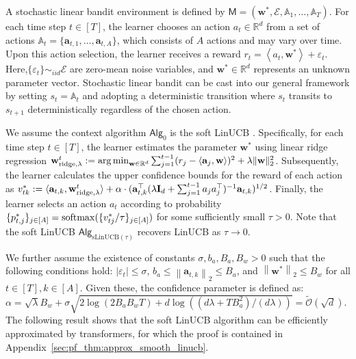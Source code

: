 \documentclass[10pt]{article}
\newcommand{\id}{\bI}
\newcommand{\eps}{\varepsilon}
\DeclareMathOperator*{\argmin}{arg\,min}
\newcommand{\norm}[1]{\left\|{#1}\right\|}
\newcommand{\ltwo}[1]{\norm{#1}_2}
\newcommand{\<}{\left\langle}
\renewcommand{\>}{\right\rangle}
\newcommand{\ridge}{{\rm ridge}}
\newcommand{\R}{\mathbb{R}}
\newcommand{\inst}{{\mathsf{M}}}
\newcommand{\sLinUCB}{{\mathrm{sLinUCB}}}
\newcommand{\temp}{{\tau}}
\newcommand{\cwid}{{\alpha}}
\newcommand{\tcO}{{\tilde{\mathcal O}}}
\newcommand{\action}{{a}}
\newcommand{\reward}{{r}}
\newcommand{\totlen}{{T}}
\newcommand{\softmax}{{\rm softmax}}
\newcommand{\sAlg}{{\mathsf{Alg}}}
\newcommand{\aset}{{\sA}}
\newcommand{\TrueLBPar}{{\bw^*}}
\newcommand{\Noise}{{\eps}}
\newcommand{\Noisedist}{{\mathcal{E}}}
\newcommand{\Numact}{{A}}
\def\sA{{\mathbb{A}}}
\def\bI{{\mathbf I}}
\def\ba{{\mathbf a}}
\def\bw{{\mathbf w}}
\begin{document}
A stochastic linear bandit environment is defined by $\inst=(\TrueLBPar,\Noisedist,\aset_1,\ldots,\aset_\totlen)$. For each time step $t\in[\totlen]$, the learner chooses an action $\action_t\in\R^{d}$ from a set of actions $\sA_t=\{\ba_{t,1},\ldots,\ba_{t,\Numact}\}$, which consists of $\Numact$ actions and may vary over time. Upon this action selection, the learner receives a reward $\reward_t=\<\action_t,\TrueLBPar\>+\Noise_t$. Here,$\{ \Noise_t \} \sim_{ iid} \Noisedist$ are zero-mean noise variables, and $\TrueLBPar\in\R^{d}$ represents an unknown parameter vector. Stochastic linear bandit can be cast into our general framework by setting $s_t = \aset_t$ and adopting a deterministic transition where $s_t$ transits to $s_{t+1}$ deterministically regardless of the chosen action.






We assume the context algorithm $\sAlg_0$ is the soft LinUCB \citep{chu2011contextual}. Specifically, for each time step $t\in[\totlen]$, the learner estimates the parameter $\TrueLBPar$ using linear ridge regression $\bw^t_{\ridge,\lambda}:=\argmin_{\bw\in\R^d} \sum_{j=1}^{t-1}(\reward_j-\<\ba_j,\bw\>)^2+ \lambda \|\bw\|_2^2$. Subsequently, the learner calculates the upper confidence bounds for the reward of each action as $v^*_{tk}:=\langle \ba_{t,k},\bw^t_{\ridge,\lambda}\rangle +\cwid \cdot (\ba_{t,k}^\top (\lambda\id_d+\sum_{j=1}^{t-1}\action_j\action_j^\top)^{-1}  \ba_{t,k})^{1/2}$. Finally, the learner selects an action $\action_t$ according to probability $\{ p^*_{t,j} \}_{j \in [\Numact]} = \softmax(\{v^*_{tj}/\temp \}_{j \in [\Numact]})$ for some sufficiently small $\temp>0$. Note that the soft LinUCB $\sAlg_{\sLinUCB(\temp)}$ recovers LinUCB as $\temp\to 0$.








We further assume the existence of constants $\sigma,b_a,B_a,B_w>0$ such that the following conditions hold:   $|\Noise_t|\leq\sigma$, $b_a\leq\ltwo{\ba_{t,k}}\leq B_a$, and $\ltwo{\bw^*}\le B_w$ for all $t\in[\totlen],k\in[\Numact]$. Given these, the confidence parameter is defined as: $\cwid=\sqrt{\lambda}B_w+\sigma\sqrt{2\log (2B_aB_w \totlen )+d\log((d\lambda+\totlen B_a^2)/(d\lambda))} = \tcO(\sqrt{d})$. The following result shows that the soft LinUCB algorithm can be efficiently approximated by transformers, for which the proof is contained in Appendix~\ref{sec:pf_thm:approx_smooth_linucb}.
\end{document}
